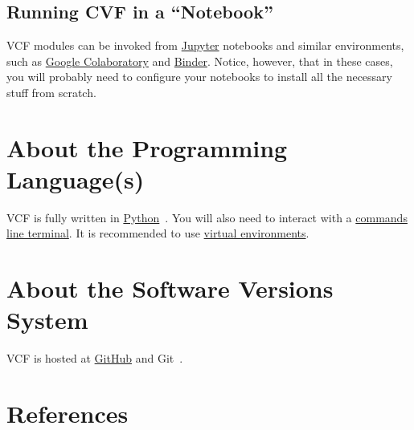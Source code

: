 \subsection{Running CVF in a ``Notebook''}
VCF modules can be invoked from \href{https://jupyter.org/}{Jupyter}
notebooks and similar environments, such as
\href{https://colab.research.google.com/}{Google Colaboratory} and
\href{https://mybinder.org/}{Binder}. Notice, however, that in these
cases, you will probably need to configure your notebooks to install
all the necessary stuff from scratch.

\section{About the Programming Language(s)}

VCF is fully written in
\href{https://www.python.org/}{Python}~\cite{vruiz__YAPT}. You will
also need to interact with a
\href{https://en.wikipedia.org/wiki/Command-line_interface}{commands
  line terminal}. It is recommended to use
\href{https://docs.python.org/3/library/venv.html}{virtual
  environments}.

\section{About the Software Versions System}

VCF is hosted at \href{https://github.com}{GitHub} and Git~\cite{vruiz__GitHub}.

\section{References}

\renewcommand{\addcontentsline}[3]{}%

